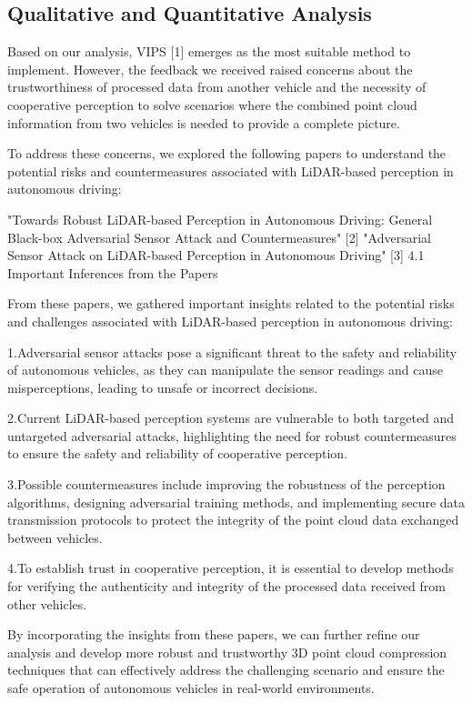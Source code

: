 \documentclass[conference]{IEEEtran}
\begin{document}
\subsection{Qualitative and Quantitative Analysis}
Based on our analysis, VIPS [1] emerges as the most suitable method to implement. However, the feedback we received raised concerns about the trustworthiness of processed data from another vehicle and the necessity of cooperative perception to solve scenarios where the combined point cloud information from two vehicles is needed to provide a complete picture.


To address these concerns, we explored the following papers to understand the potential risks and countermeasures associated with LiDAR-based perception in autonomous driving:

"Towards Robust LiDAR-based Perception in Autonomous Driving: General Black-box Adversarial Sensor Attack and Countermeasures" [2]
"Adversarial Sensor Attack on LiDAR-based Perception in Autonomous Driving" [3]
4.1 Important Inferences from the Papers

From these papers, we gathered important insights related to the potential risks and challenges associated with LiDAR-based perception in autonomous driving:

1.Adversarial sensor attacks pose a significant threat to the safety and reliability of autonomous vehicles, as they can manipulate the sensor readings and cause misperceptions, leading to unsafe or incorrect decisions.

2.Current LiDAR-based perception systems are vulnerable to both targeted and untargeted adversarial attacks, highlighting the need for robust countermeasures to ensure the safety and reliability of cooperative perception.

3.Possible countermeasures include improving the robustness of the perception algorithms, designing adversarial training methods, and implementing secure data transmission protocols to protect the integrity of the point cloud data exchanged between vehicles.

4.To establish trust in cooperative perception, it is essential to develop methods for verifying the authenticity and integrity of the processed data received from other vehicles.


By incorporating the insights from these papers, we can further refine our analysis and develop more robust and trustworthy 3D point cloud compression techniques that can effectively address the challenging scenario and ensure the safe operation of autonomous vehicles in real-world environments.
\end{document}
